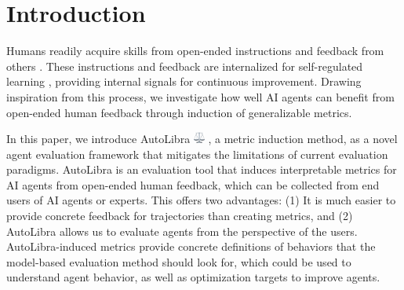 \section{Introduction}

Humans readily acquire skills from open-ended instructions and feedback from others
\citep{tomasello1993cultural}. These instructions and feedback are internalized for
self-regulated learning \citep{pintrich2002development,nicol2006formative}, providing
internal signals for continuous improvement. Drawing inspiration from this
process, we investigate how well AI agents can benefit from open-ended human feedback
through induction of generalizable metrics.


In this paper, we introduce AutoLibra \protect
\includegraphics[height=1em]{figs/scale.png}
, a metric induction method, as a novel agent evaluation framework that
mitigates the limitations of current evaluation paradigms. AutoLibra is an evaluation
tool that induces interpretable metrics for AI agents from open-ended human feedback,
which can be collected from end users of AI agents or experts. This offers two advantages:
(1) It is much easier to provide concrete feedback for trajectories than
creating metrics, and (2) AutoLibra allows us to evaluate agents from the perspective
of the users. AutoLibra-induced metrics provide concrete definitions of
behaviors that the model-based evaluation method should look for, which could be
used to understand agent behavior, as well as optimization targets to improve
agents.

